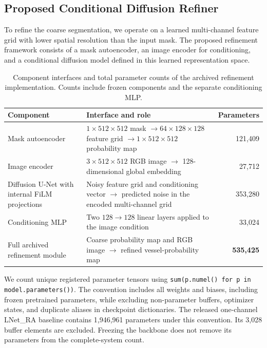 \documentclass[jimaging,article,submit,pdftex,moreauthors]{Definitions/mdpi}%
\begin{document}
\subsection{Proposed Conditional Diffusion Refiner}



To refine the coarse segmentation, we operate on a learned multi-channel feature grid with lower spatial resolution than the input mask. The proposed refinement framework consists of a mask autoencoder, an image encoder for conditioning, and a conditional diffusion model defined in this learned representation space.

\begin{table}[htbp]
\centering
\caption{Component interfaces and total parameter counts of the archived refinement implementation. Counts include frozen components and the separate conditioning MLP.}
\label{tab:architecture_params}
\small
\begin{tabularx}{\textwidth}{@{}p{}Xr@{}}
\toprule
Component & Interface and role & Parameters \\
\midrule
Mask autoencoder & $1\times512\times512$ mask $\rightarrow 64\times128\times128$ feature grid $\rightarrow 1\times512\times512$ probability map & 121,409 \\
Image encoder & $3\times512\times512$ RGB image $\rightarrow$ 128-dimensional global embedding & 27,712 \\
Diffusion U-Net with internal FiLM projections & Noisy feature grid and conditioning vector $\rightarrow$ predicted noise in the encoded multi-channel grid & 353,280 \\
Conditioning MLP & Two $128\rightarrow128$ linear layers applied to the image condition & 33,024 \\
\midrule
Full archived refinement module & Coarse probability map and RGB image $\rightarrow$ refined vessel-probability map & \textbf{535,425} \\
\bottomrule
\end{tabularx}
\end{table}

We count unique registered parameter tensors using \texttt{sum(p.numel() for p in model.parameters())}. The convention includes all weights and biases, including frozen pretrained parameters, while excluding non-parameter buffers, optimizer states, and duplicate aliases in checkpoint dictionaries. The released one-channel LNet\_RA baseline contains 1,946,961 parameters under this convention. Its 3,028 buffer elements are excluded. Freezing the backbone does not remove its parameters from the complete-system count.
\end{document}
